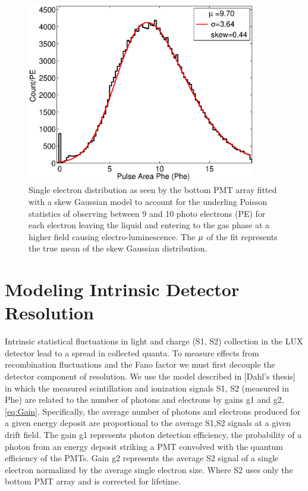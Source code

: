 \begin{figure}[h!]\centering
\includegraphics[width=100mm]{Recombination_LY_QY/Figures/bottom_SE.eps}
\caption{Single electron distribution as seen by the bottom PMT array fitted with a skew Gaussian model to account for the underling Poisson statistics of observing between 9 and 10 photo electrons (PE) for each electron leaving the liquid and entering to the gas phase at a higher field causing electro-luminescence. The $\rm \mu$ of the fit represents the true mean of the skew Gaussian distribution. }
\label{fig:SingleE}
\end{figure}

\section{Modeling Intrinsic Detector Resolution}

Intrinsic statistical fluctuations in light and charge (S1, S2) collection in the LUX detector lead to a spread in collected quanta. To measure effects from recombination fluctuations and the Fano factor we must first decouple the detector component of resolution. We use the model described in [Dahl's thesis] in which the measured scintillation and ionization signals S1, S2 (measured in Phe) are related to the number of photons and electrons by gains g1 and g2, \ref{eq:Gain}. Specifically, the average number of photons and electrons produced for a given energy deposit are proportional to the average S1,S2 signals at a given drift field. The gain g1 represents photon detection efficiency, the probability of a photon from an energy deposit striking a PMT convolved with the quantum efficiency of the PMTs. Gain g2 represents the average S2 signal of a single electron normalized by the average single electron size. Where S2 uses only the bottom PMT array and is corrected for lifetime.



